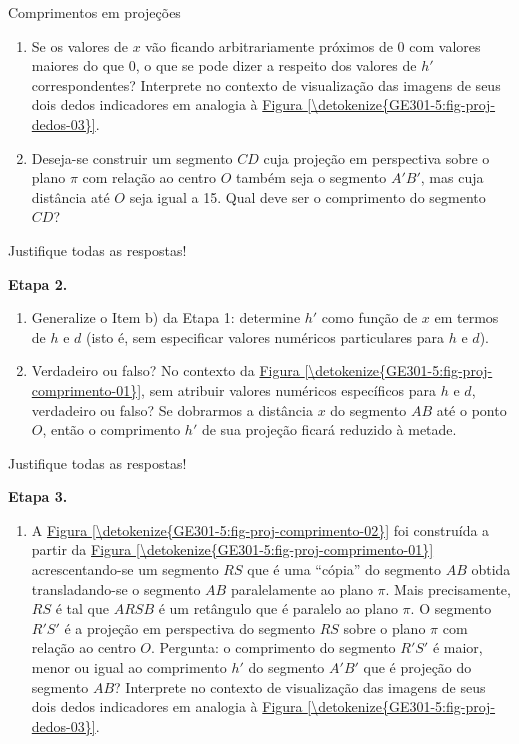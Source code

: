 \begin{task}{Comprimentos em projeções}
\begin{enumerate}
\item {} 
Se os valores de \(x\) vão ficando arbitrariamente próximos de \(0\) com valores maiores do que \(0\), o que se pode dizer a respeito dos valores de \(h'\) correspondentes? Interprete no contexto de visualização das imagens de seus dois dedos indicadores em analogia à \hyperref[\detokenize{GE301-5:fig-proj-dedos-03}]{Figura \ref{\detokenize{GE301-5:fig-proj-dedos-03}}}.

\item {} 
Deseja-se construir um segmento \(CD\) cuja projeção em perspectiva sobre o plano \(\pi\) com relação ao centro \(O\) também seja o segmento \(A'B'\), mas cuja distância até \(O\) seja igual a 15. Qual deve ser o comprimento do segmento \(CD\)?

\end{enumerate}

Justifique todas as respostas!

\needspace{.15\textheight}

\textbf{Etapa 2.}
\begin{enumerate}
\item {} 
Generalize o Item b) da Etapa 1: determine \(h'\) como função de \(x\) em termos de \(h\) e \(d\) (isto é, sem especificar valores numéricos particulares para \(h\) e \(d\)).

\item {} 
Verdadeiro ou falso? No contexto da \hyperref[\detokenize{GE301-5:fig-proj-comprimento-01}]{Figura \ref{\detokenize{GE301-5:fig-proj-comprimento-01}}}, sem atribuir valores numéricos específicos para \(h\) e \(d\), verdadeiro ou falso? Se dobrarmos a distância \(x\) do segmento \(AB\) até o ponto \(O\), então o comprimento \(h'\) de sua projeção ficará reduzido à metade.

\end{enumerate}

Justifique todas as respostas!

\needspace{.10\textheight}

\textbf{Etapa 3.}
\begin{enumerate}
\item {} 
A \hyperref[\detokenize{GE301-5:fig-proj-comprimento-02}]{Figura \ref{\detokenize{GE301-5:fig-proj-comprimento-02}}} foi construída a partir da \hyperref[\detokenize{GE301-5:fig-proj-comprimento-01}]{Figura \ref{\detokenize{GE301-5:fig-proj-comprimento-01}}} acrescentando-se um segmento \(RS\) que é uma “cópia” do segmento \(AB\) obtida transladando-se o segmento \(AB\) paralelamente ao plano \(\pi\). Mais precisamente, \(RS\) é tal que \(ARSB\) é um retângulo que é paralelo ao plano \(\pi\). O segmento \(R'S'\) é a projeção em perspectiva do segmento \(RS\) sobre o plano \(\pi\) com relação ao centro \(O\). Pergunta: o comprimento do segmento \(R'S'\) é maior, menor ou igual ao comprimento \(h'\) do segmento \(A'B'\) que é projeção do segmento \(AB\)? Interprete no contexto de visualização das imagens de seus dois dedos indicadores em analogia à \hyperref[\detokenize{GE301-5:fig-proj-dedos-03}]{Figura \ref{\detokenize{GE301-5:fig-proj-dedos-03}}}.


\end{enumerate}
\end{task}
